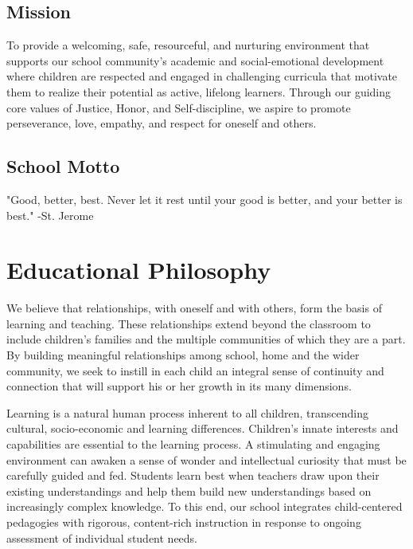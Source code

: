 \documentclass[11pt, letterpaper]{article}
\begin{document}
\subsection{Mission}
To provide a welcoming, safe, resourceful, and nurturing environment that supports our school community's academic and social-emotional development where children are respected and engaged in challenging curricula that motivate them to realize their potential as active, lifelong learners. Through our guiding core values of Justice, Honor, and Self-discipline, we aspire to promote perseverance, love, empathy, and respect for oneself and others.

\subsection{School Motto}
"Good, better, best. Never let it rest until your good is better, and your better is best."  -St. Jerome

\section{Educational Philosophy}
We believe that relationships, with oneself and with others, form the basis of learning and teaching. These relationships extend beyond the classroom to include children’s families and the multiple communities of which they are a part. By building meaningful relationships among school, home and the wider community, we seek to instill in each child an integral sense of continuity and connection that will support his or her growth in its many dimensions.

Learning is a natural human process inherent to all children, transcending cultural, socio-economic and learning differences. Children’s innate interests and capabilities are essential to the learning process. A stimulating and engaging environment can awaken a sense of wonder and intellectual curiosity that must be carefully guided and fed. Students learn best when teachers draw upon their existing understandings and help them build new understandings based on increasingly complex knowledge. To this end, our school integrates child-centered pedagogies with rigorous, content-rich instruction in response to ongoing assessment of individual student needs.
\end{document}
